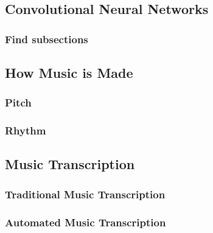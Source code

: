\newpage




\newpage
\subsection{Convolutional Neural Networks}
\subsubsection{Find subsections}

\newpage
\subsection{How Music is Made}
\subsubsection{Pitch}
\subsubsection{Rhythm}

\newpage
\subsection{Music Transcription}
\subsubsection{Traditional Music Transcription}
\subsubsection{Automated Music Transcription}